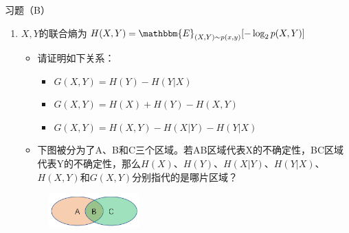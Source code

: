 \documentclass{ctexbeamer}        %
\begin{document}
\begin{frame}[allowframebreaks]{习题（B）}
\begin{enumerate}
\framebreak
\item $X,Y$的联合熵为$H(X,Y)=\mathbbm{E}_{(X,Y)\sim p(x,y)}[-\log_2p(X,Y)]$
\begin{itemize}
\item 请证明如下关系：
\begin{itemize}
\item $G(X,Y)=H(Y)-H(Y\vert X)$
\item $G(X,Y)=H(X)+H(Y)-H(X,Y)$
\item $G(X,Y)=H(X,Y)-H(X\vert Y)-H(Y\vert X)$
\end{itemize}
\item 下图被分为了A、B和C三个区域。若AB区域代表X的不确定性，BC区域代表Y的不确定性，那么$H(X)$、$H(Y)$、$H(X\vert Y)$、$H(Y\vert X)$、$H(X,Y)$和$G(X,Y)$分别指代的是哪片区域？
\end{itemize}
\begin{figure}
\begin{center}
\includegraphics[width=3.5cm]{pic3.png}
\end{center}
\end{figure}
\end{enumerate}
\end{frame}

\end{document}
